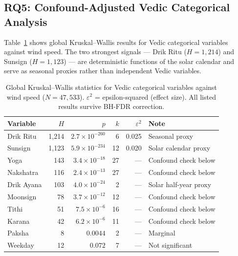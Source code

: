 \documentclass[12pt,a4paper]{article}
\begin{document}
\subsection{RQ5: Confound-Adjusted Vedic Categorical Analysis}
\label{sec:h5}

Table~\ref{tab:kw_global} shows global Kruskal--Wallis results for Vedic
categorical variables against wind speed.
The two strongest signals — Drik Ritu ($H = 1{,}214$) and Sunsign ($H = 1{,}123$)
— are deterministic functions of the solar calendar and serve as seasonal proxies
rather than independent Vedic variables.

\begin{table}[H]
  \centering
  \caption{Global Kruskal--Wallis statistics for Vedic categorical variables
           against wind speed ($N = 47{,}533$). $\varepsilon^2$ = epsilon-squared
           (effect size). All listed results survive BH-FDR correction.}
  \label{tab:kw_global}
  \begin{tabular}{lrrrrl}
    \toprule
    \textbf{Variable} & \boldmath$H$ & \boldmath$p$ & \boldmath$k$ &
    \boldmath$\varepsilon^2$ & \textbf{Note} \\
    \midrule
    Drik Ritu    & 1{,}214 & $2.7\times10^{-260}$ & 6  & 0.025 & Seasonal proxy \\
    Sunsign      & 1{,}123 & $5.9\times10^{-234}$ & 12 & 0.020 & Solar calendar proxy \\
    Yoga         &   143   & $3.4\times10^{-18}$  & 27 & ---   & Confound check below \\
    Nakshatra    &   116   & $2.4\times10^{-13}$  & 27 & ---   & Confound check below \\
    Drik Ayana   &   103   & $4.0\times10^{-24}$  & 2  & ---   & Solar half-year proxy \\
    Moonsign     &    78   & $3.7\times10^{-12}$  & 12 & ---   & Confound check below \\
    Tithi        &    51   & $7.5\times10^{-6}$   & 16 & ---   & Confound check below \\
    Karana       &    42   & $6.2\times10^{-6}$   & 11 & ---   & Confound check below \\
    Paksha       &     8   & $0.0044$             & 2  & ---   & Marginal \\
    Weekday      &    12   & $0.072$              & 7  & ---   & Not significant \\
    \bottomrule
  \end{tabular}
\end{table}
\end{document}
